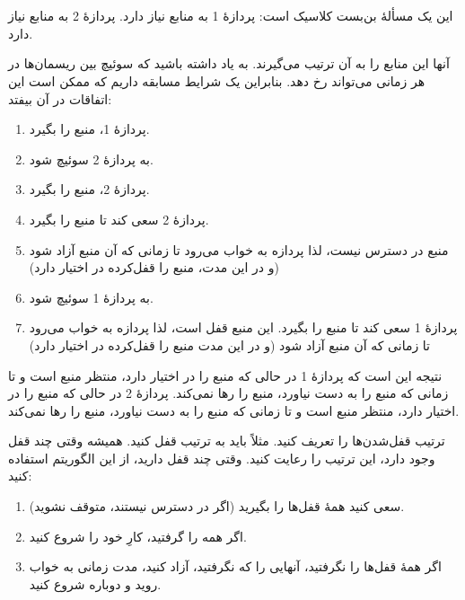 \section{}
\paragraph{}\label{answer:24}
این یک مسألهٔ بن‌بست کلاسیک است:
پردازهٔ 1 به منابع  نیاز دارد.
پردازهٔ 2 به منابع  نیاز دارد.

آنها این منابع را به آن ترتیب می‌گیرند. به یاد داشته باشید که سوئیچ بین ریسمان‌ها در هر زمانی می‌تواند رخ دهد. بنابراین یک شرایط مسابقه داریم که ممکن است این اتفاقات در آن بیفتد:
\begin{enumerate}
    \item پردازهٔ 1، منبع  را بگیرد.
    \item به پردازهٔ 2 سوئیچ شود.
    \item پردازهٔ 2، منبع  را بگیرد.
    \item پردازهٔ 2 سعی کند تا منبع  را بگیرد.
    \item منبع  در دسترس نیست، لذا پردازه به خواب می‌رود تا زمانی که آن منبع آزاد شود (و در این مدت، منبع  را قفل‌کرده در اختیار دارد)
    \item به پردازهٔ 1 سوئیچ شود.
    \item پردازهٔ 1 سعی کند تا منبع  را بگیرد. این منبع قفل است، لذا پردازه به خواب می‌رود تا زمانی که آن منبع آزاد شود (و در این مدت منبع  را قفل‌کرده در اختیار دارد)
\end{enumerate}

نتیجه این است که پردازهٔ 1 در حالی که منبع  را در اختیار دارد، منتظر منبع  است و تا زمانی که منبع  را به دست نیاورد، منبع  را رها نمی‌کند. پردازهٔ 2 در حالی که منبع  را در اختیار دارد، منتظر منبع  است و تا زمانی که منبع  را به دست نیاورد، منبع  را رها نمی‌کند.

ترتیب قفل‌شدن‌ها را تعریف کنید. مثلاً باید به ترتیب  قفل کنید. همیشه وقتی چند قفل وجود دارد، این ترتیب را رعایت کنید. وقتی چند قفل دارید، از این الگوریتم استفاده کنید:
\begin{enumerate}
    \item سعی کنید همهٔ قفل‌ها را بگیرید (اگر در دسترس نیستند، متوقف نشوید).
    \item اگر همه را گرفتید، کارِ خود را شروع کنید.
    \item اگر همهٔ قفل‌ها را نگرفتید، آنهایی را که نگرفتید، آزاد کنید، مدت زمانی به خواب روید و دوباره شروع کنید.
\end{enumerate}
